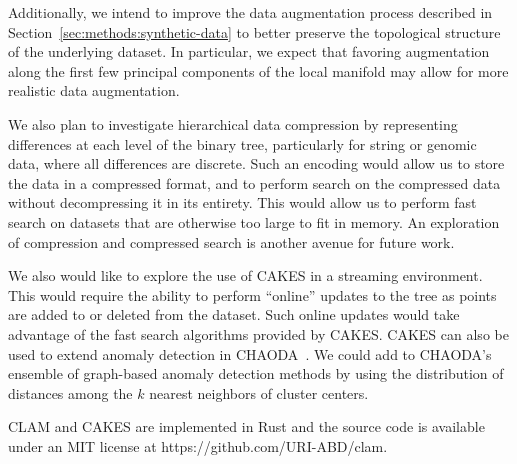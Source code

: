 Additionally, we intend to improve the data augmentation process described in Section~\ref{sec:methods:synthetic-data} to better preserve the topological structure of the underlying dataset.
In particular, we expect that favoring augmentation along the first few principal components of the local manifold may allow for more realistic data augmentation.

We also plan to investigate hierarchical data compression by representing differences at each level of the binary tree, particularly for string or genomic data, where all differences are discrete.
Such an encoding would allow us to store the data in a compressed format, and to perform search on the compressed data without decompressing it in its entirety.
This would allow us to perform fast search on datasets that are otherwise too large to fit in memory.
An exploration of compression and compressed search is another avenue for future work.

We also would like to explore the use of CAKES in a streaming environment.
This would require the ability to perform ``online'' updates to the tree as points are added to or deleted from the dataset.
Such online updates would take advantage of the fast search algorithms provided by CAKES.  %
CAKES can also be used to extend anomaly detection in CHAODA~\cite{ishaq2021clustered}.
We could add to CHAODA's ensemble of graph-based anomaly detection methods by using the distribution of distances among the $k$ nearest neighbors of cluster centers.

CLAM and CAKES are implemented in Rust and the source code is available under an MIT license at https://github.com/URI-ABD/clam.
